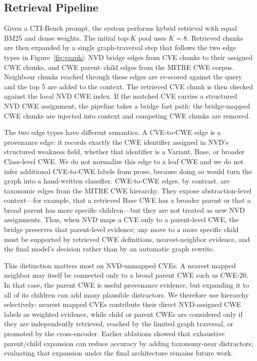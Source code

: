 \subsection{Retrieval Pipeline}
\label{sec:retrieval}

Given a CTI-Bench prompt, the system performs hybrid retrieval with equal BM25 and dense weights. The initial top-$K$ pool uses $K=8$. Retrieved chunks are then expanded by a single graph-traversal step that follows the two edge types in Figure~\ref{fig:graph}: NVD bridge edges from CVE chunks to their assigned CWE chunks, and CWE parent--child edges from the MITRE CWE corpus. Neighbour chunks reached through these edges are re-scored against the query and the top 5 are added to the context. The retrieved CVE chunk is then checked against the local NVD CWE index. If the matched CVE carries a structured NVD CWE assignment, the pipeline takes a bridge fast path: the bridge-mapped CWE chunks are injected into context and competing CWE chunks are removed.

The two edge types have different semantics. A CVE-to-CWE edge is a provenance edge: it records exactly the CWE identifier assigned in NVD's structured weakness field, whether that identifier is a Variant, Base, or broader Class-level CWE. We do not normalize this edge to a leaf CWE and we do not infer additional CVE-to-CWE labels from prose, because doing so would turn the graph into a hand-written classifier. CWE-to-CWE edges, by contrast, are taxonomic edges from the MITRE CWE hierarchy. They expose abstraction-level context---for example, that a retrieved Base CWE has a broader parent or that a broad parent has more specific children---but they are not treated as new NVD assignments. Thus, when NVD maps a CVE only to a parent-level CWE, the bridge preserves that parent-level evidence; any move to a more specific child must be supported by retrieved CWE definitions, nearest-neighbor evidence, and the final model's decision rather than by an automatic graph rewrite.

This distinction matters most on NVD-unmapped CVEs. A nearest mapped neighbor may itself be connected only to a broad parent CWE such as CWE-20. In that case, the parent CWE is useful provenance evidence, but expanding it to all of its children can add many plausible distractors. We therefore use hierarchy selectively: nearest mapped CVEs contribute their direct NVD-assigned CWE labels as weighted evidence, while child or parent CWEs are considered only if they are independently retrieved, reached by the limited graph traversal, or promoted by the cross-encoder. Earlier ablations showed that exhaustive parent/child expansion can reduce accuracy by adding taxonomy-near distractors; evaluating that expansion under the final architecture remains future work.

